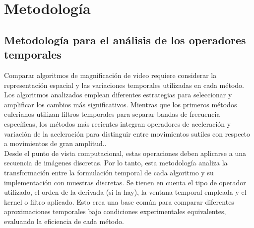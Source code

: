 ﻿\setcounter{secnumdepth}{5}
\chapter{Metodología}
\label{cap:metodologia}

\glsresetall



\section{Metodología para el análisis de los operadores temporales}

Comparar algoritmos de magnificación de video requiere considerar la representación espacial y  las variaciones temporales utilizadas en cada método. Los algoritmos analizados emplean diferentes estrategias para seleccionar y amplificar los cambios más significativos. Mientras que los primeros métodos eulerianos utilizan filtros temporales para separar bandas de frecuencia específicas, los métodos más recientes integran operadores de aceleración y variación de la aceleración para distinguir entre movimientos sutiles con respecto a movimientos de gran amplitud.\cite{wu2012eulerian,wadhwa2013phase,zhang2017acceleration,takeda2019wild}.\\


Desde el punto de vista computacional, estas operaciones deben aplicarse a una secuencia de imágenes discretas. Por lo tanto, esta metodología analiza la transformación entre la formulación temporal de cada algoritmo y su implementación con muestras discretas. Se tienen en cuenta el tipo de operador utilizado, el orden de la derivada (si la hay), la ventana temporal empleada y el kernel o filtro aplicado. Esto crea una base común para comparar diferentes aproximaciones temporales bajo condiciones experimentales equivalentes, evaluando la eficiencia de cada método.


